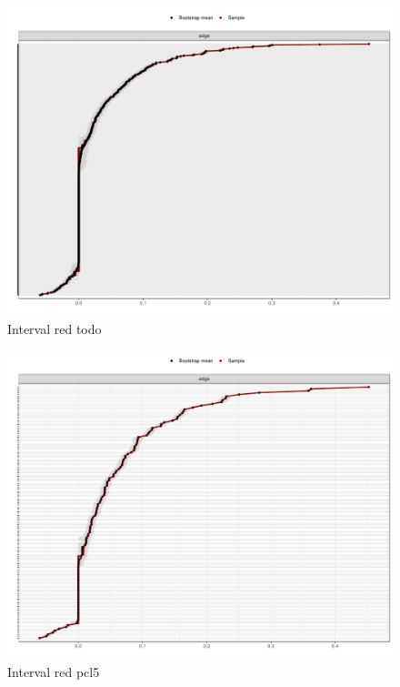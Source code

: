 \documentclass[11pt,spanish]{article}\usepackage[]{graphicx}\usepackage[]{color}
\begin{document}
\begin{figure}[ht]
\centering
\includegraphics[scale=0.5]{images/interval_todos.pdf}
\caption{Interval red todo}
\label{fig:interval_todo}
\end{figure}

\begin{figure}[ht]
\centering
\includegraphics[scale=0.5]{images/interval_pcl15.pdf}
\caption{Interval red pcl5}
\label{fig:interval_pcl5}
\end{figure}
\end{document}
